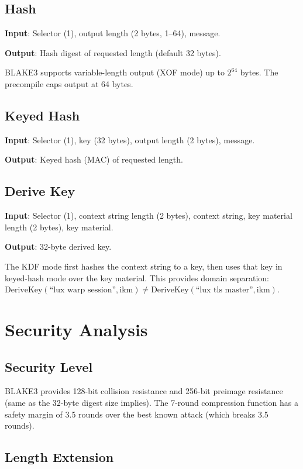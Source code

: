 \documentclass[11pt,a4paper]{article}
\begin{document}
\subsection{Hash}

\textbf{Input}: Selector (1), output length (2 bytes, 1--64), message.

\textbf{Output}: Hash digest of requested length (default 32 bytes).

BLAKE3 supports variable-length output (XOF mode) up to $2^{64}$ bytes.
The precompile caps output at 64 bytes.

\subsection{Keyed Hash}

\textbf{Input}: Selector (1), key (32 bytes), output length (2 bytes), message.

\textbf{Output}: Keyed hash (MAC) of requested length.

\subsection{Derive Key}

\textbf{Input}: Selector (1), context string length (2 bytes), context string,
key material length (2 bytes), key material.

\textbf{Output}: 32-byte derived key.

The KDF mode first hashes the context string to a key, then uses that key in
keyed-hash mode over the key material. This provides domain separation:
$\text{DeriveKey}(\text{``lux warp session''}, \text{ikm}) \neq
\text{DeriveKey}(\text{``lux tls master''}, \text{ikm})$.

\section{Security Analysis}

\subsection{Security Level}

BLAKE3 provides 128-bit collision resistance and 256-bit preimage resistance
(same as the 32-byte digest size implies). The 7-round compression function
has a safety margin of 3.5 rounds over the best known attack (which breaks
3.5 rounds).

\subsection{Length Extension}
\end{document}
